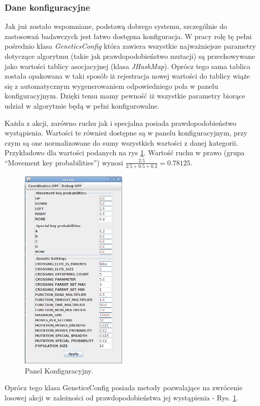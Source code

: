 \subsubsection{Dane konfiguracyjne}
\begin{par}
	Jak już zostało wspomniane, podstawą dobrego systemu, szczególnie do zastosowań badawczych jest łatwo dostępna konfiguracja. 
	W pracy rolę tę pełni pośrednio klasa \textit{GeneticsConfig} która zawiera wszystkie najważniejsze parametry dotyczące algorytmu (takie jak prawdopodobieństwo mutacji) są przechowywane jako wartości tablicy asocjacyjnej (klasa \textit{JHashMap}). 
	Oprócz tego sama tablica została opakowana w taki sposób iż rejestracja nowej wartości do tablicy wiąże się z automatycznym wygenerowaniem odpowiedniego pola w panelu konfiguracyjnym. 
	Dzięki temu mamy pewność iż wszystkie parametry biorące udział w algorytmie będą w pełni konfigurowalne.
\end{par}
\begin{par}
	Każda z akcji, zarówno ruchu jak i specjalna posiada prawdopodobieństwo wystąpienia.
	Wartości te również dostępne są w panelu konfiguracyjnym, przy czym są one normalizowane do sumy wszystkich wartości z danej kategorii.
	Przykładowo dla wartości podanych na rys \ref{fig:config1}. Wartość ruchu w prawo (grupa ``Movement key probabilities'') wynosi $\frac{2.5}{2.5+0.5+0.2}=0.78125$.
	\begin{figure}[!h]
		\centering
		\includegraphics[width=2in]{obrazki/config1.png}
		\caption{Panel Konfiguracyjny.}
		\label{fig:config1}
	\end{figure}
	Oprócz tego klasa GeneticsConfig posiada metody pozwalające na zwrócenie losowej akcji w zależności od prawdopodobieństwa jej wystąpienia - Rys. \ref{fig:config1}.
\end{par}
